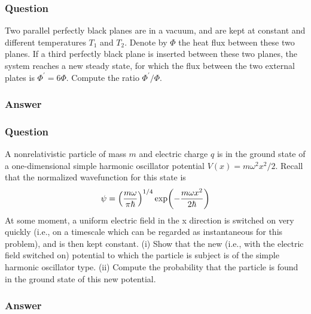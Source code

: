\subsubsection{Question}
Two parallel perfectly black planes are in a vacuum, and are kept at constant and different temperatures $T_1$ and $T_2$. Denote by $\Phi$ the heat flux between these two planes. If a third perfectly black plane is inserted between these two planes, the system reaches a new steady state, for which the flux between the two external plates is $\Phi^\prime=6\Phi$. Compute the ratio $\Phi^\prime/\Phi$.

\subsubsection{Answer}

\subsubsection{Question}
A nonrelativistic particle of mass $m$ and electric charge $q$ is in the ground state of a one-dimensional simple harmonic oscillator potential $V (x) = m\omega^2x^2/2$. Recall that the normalized wavefunction for this state is
\begin{equation}
	\psi = \qty(\frac{m\omega}{\pi\hbar})^{1/4}\exp(-\frac{m\omega x^2}{2\hbar})
\end{equation}
At some moment, a uniform electric field in the x direction is switched on very quickly (i.e., on a timescale which can be regarded as instantaneous for this problem), and is then kept constant. (i) Show that the new (i.e., with the electric field switched on) potential to which the particle is subject is of the simple harmonic oscillator type. (ii) Compute the probability that the particle is found in the ground state of this new potential.

\subsubsection{Answer}




